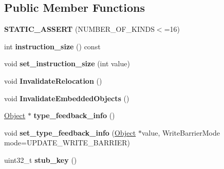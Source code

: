 \subsection*{Public Member Functions}
\begin{DoxyCompactItemize}
\item 
\hypertarget{classv8_1_1internal_1_1_code_a87b97e6e0e073c55c13035f8bae18eba}{}{\bfseries S\+T\+A\+T\+I\+C\+\_\+\+A\+S\+S\+E\+R\+T} (N\+U\+M\+B\+E\+R\+\_\+\+O\+F\+\_\+\+K\+I\+N\+D\+S$<$=16)\label{classv8_1_1internal_1_1_code_a87b97e6e0e073c55c13035f8bae18eba}

\item 
\hypertarget{classv8_1_1internal_1_1_code_a64a307fdd94b4f88bc9d5cd72ddc97f0}{}int {\bfseries instruction\+\_\+size} () const \label{classv8_1_1internal_1_1_code_a64a307fdd94b4f88bc9d5cd72ddc97f0}

\item 
\hypertarget{classv8_1_1internal_1_1_code_ae7cbcbe577a5cc5fc05afed65bc1f2e1}{}void {\bfseries set\+\_\+instruction\+\_\+size} (int value)\label{classv8_1_1internal_1_1_code_ae7cbcbe577a5cc5fc05afed65bc1f2e1}

\item 
\hypertarget{classv8_1_1internal_1_1_code_a2b5f8b6232a03f5abdf614eb02ad4bab}{}void {\bfseries Invalidate\+Relocation} ()\label{classv8_1_1internal_1_1_code_a2b5f8b6232a03f5abdf614eb02ad4bab}

\item 
\hypertarget{classv8_1_1internal_1_1_code_afd6545476f93acf9e3e4dfce8753c4df}{}void {\bfseries Invalidate\+Embedded\+Objects} ()\label{classv8_1_1internal_1_1_code_afd6545476f93acf9e3e4dfce8753c4df}

\item 
\hypertarget{classv8_1_1internal_1_1_code_ad6d8f45df325424a3ae7793afed6996c}{}\hyperlink{classv8_1_1internal_1_1_object}{Object} $\ast$ {\bfseries type\+\_\+feedback\+\_\+info} ()\label{classv8_1_1internal_1_1_code_ad6d8f45df325424a3ae7793afed6996c}

\item 
\hypertarget{classv8_1_1internal_1_1_code_aef2634ec3d04c0c444c9ece4b21bc4ff}{}void {\bfseries set\+\_\+type\+\_\+feedback\+\_\+info} (\hyperlink{classv8_1_1internal_1_1_object}{Object} $\ast$value, Write\+Barrier\+Mode mode=U\+P\+D\+A\+T\+E\+\_\+\+W\+R\+I\+T\+E\+\_\+\+B\+A\+R\+R\+I\+E\+R)\label{classv8_1_1internal_1_1_code_aef2634ec3d04c0c444c9ece4b21bc4ff}

\item 
\hypertarget{classv8_1_1internal_1_1_code_ace6405ba7f87cdd53bfc23c014aaa15c}{}uint32\+\_\+t {\bfseries stub\+\_\+key} ()\label{classv8_1_1internal_1_1_code_ace6405ba7f87cdd53bfc23c014aaa15c}


\end{DoxyCompactItemize}
